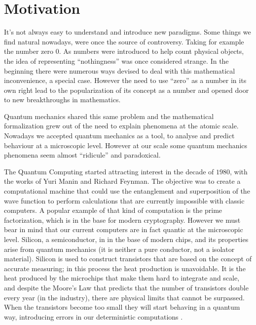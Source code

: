 \section{Motivation}
\label{sec:int_motivation}



It's not always easy to understand and introduce new paradigms. Some things we find natural nowadays, were once the source of controversy. Taking for example the number zero $0$. As numbers were introduced to help count physical objects, the idea of representing ``nothingness'' was once considered strange. In the beginning there were numerous ways devised to deal with this mathematical inconvenience, a special case. However the need to use ``zero'' as a number in its own right lead to the popularization of its concept as a number and opened door to new breakthroughs in mathematics\cite{Kaplan2000}. 

Quantum mechanics shared this same problem and the mathematical formalization grew out of the need to explain phenomena at the atomic scale\cite{Mehra1982}. Nowadays we  accepted quantum mechanics as a tool, to analyse and predict behaviour at a microscopic level. However at our scale some quantum mechanics phenomena seem almost ``ridicule'' and paradoxical.

The Quantum Computing started attracting interest in the decade of $1980$, with the works of Yuri Manin and Richard Feynman. The objective was to create a computational machine that could use the entanglement and superposition of the wave function to perform calculations that are currently impossible with classic computers. A popular example of that kind of computation is the prime factorization, which is in the base for modern cryptography. 
However we must bear in mind that our current computers are in fact quantic at the microscopic level. 
Silicon, a semiconductor, in in the base of modern chips, and its properties arise from quantum mechanics (it is neither a pure conductor, not a isolator material). Silicon is used to construct transistors that are based on the concept of accurate measuring; in this process the heat production is unavoidable. It is the heat produced by the microchips that make them hard to integrate and scale, and despite the Moore's Law that predicts that the number of transistors double every year (in the industry), there are physical limits that cannot be surpassed. When the transistors become too small they will start behaving in a quantum way, introducing errors in our deterministic computations \cite{Laughlin2005}.







